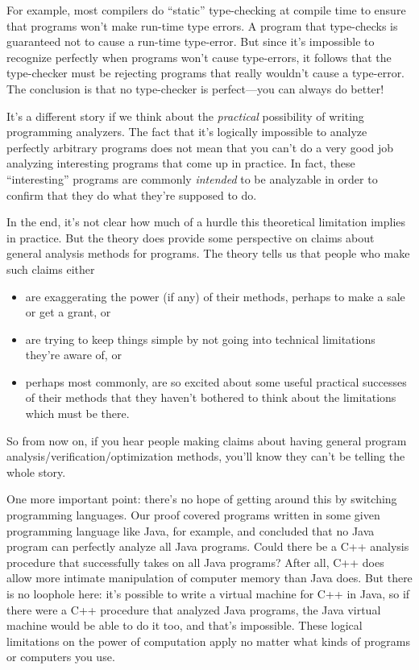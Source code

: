 For example, most compilers do ``static'' type-checking at compile
time to ensure that programs won't make run-time type errors.  A program
that type-checks is guaranteed not to cause a run-time type-error.  But
since it's impossible to recognize perfectly when programs won't cause
type-errors, it follows that the type-checker must be rejecting programs
that really wouldn't cause a type-error.  The conclusion is that no
type-checker is perfect---you can always do better!

It's a different story if we think about the \emph{practical}
possibility of writing programming analyzers.  The fact that it's
logically impossible to analyze perfectly arbitrary programs does not
mean that you can't do a very good job analyzing interesting programs
that come up in practice.  In fact, these ``interesting'' programs are
commonly \emph{intended} to be analyzable in order to confirm that
they do what they're supposed to do.

In the end, it's not clear how much of a hurdle this theoretical limitation
implies in practice.  But the theory does provide some perspective
on claims about general analysis methods for programs.  The theory
tells us that people who make such claims either

\begin{itemize}
\item are exaggerating the power (if any) of their methods, perhaps to make a
  sale or get a grant, or

\item are trying to keep things simple by not going into technical
  limitations they're aware of, or

\item perhaps most commonly, are so excited about some useful practical
    successes of their methods that they haven't bothered to think about
    the limitations which must be there.
\end{itemize}

So from now on, if you hear people making claims about having general
program analysis/verification/optimization methods, you'll know they can't
be telling the whole story.

One more important point: there's no hope of getting around this by
switching programming languages.  Our proof covered programs written
in some given programming language like Java, for example, and
concluded that no Java program can perfectly analyze all Java
programs.  Could there be a C++ analysis procedure that successfully
takes on all Java programs?  After all, C++ does allow more intimate
manipulation of computer memory than Java does.  But there is no
loophole here: it's possible to write a virtual machine for C++ in
Java, so if there were a C++ procedure that analyzed Java programs,
the Java virtual machine would be able to do it too, and that's
impossible.  These logical limitations on the power of computation
apply no matter what kinds of programs or computers you use.

